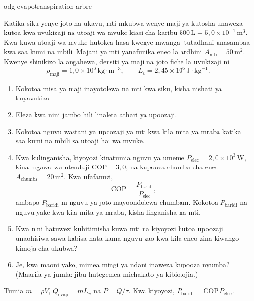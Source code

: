 \begin{exo}{odg-evapotranspiration-arbre}

Katika siku yenye joto na ukavu, mti mkubwa wenye maji ya kutosha unaweza kutoa kwa uvukizaji na utoaji wa mvuke kiasi cha karibu $500\,\text{L}=5{,}0\times10^{-1}\,\text{m}^3$. Kwa kuwa utoaji wa mvuke hutokea hasa kwenye mwanga, tutadhani unasambaa kwa saa kumi na mbili. Majani ya mti yanafunika eneo la ardhini $A_{\text{mti}}=50\,\text{m}^2$. Kwenye shinikizo la angahewa, densiti ya maji na joto fiche la uvukizaji ni
\[
\rho_{\text{maji}}=1{,}0\times10^3\,\text{kg}\!\cdot\!\text{m}^{-3},
\qquad L_v=2{,}45\times10^6\,\text{J}\!\cdot\!\text{kg}^{-1}.
\]

\begin{enumerate}
  \item Kokotoa misa ya maji inayotolewa na mti kwa siku, kisha nishati ya kuyavukiza.
  \item Eleza kwa nini jambo hili linaleta athari ya upoozaji.
  \item Kokotoa nguvu wastani ya upoozaji ya mti kwa kila mita ya mraba katika saa kumi na mbili za utoaji hai wa mvuke.
  \item Kwa kulinganisha, kiyoyozi kinatumia nguvu ya umeme $P_{\mathrm{elec}}=2{,}0\times10^3\,\text{W}$, kina mgawo wa utendaji $\mathrm{COP}=3{,}0$, na kupooza chumba cha eneo $A_{\text{chumba}}=20\,\text{m}^2$. Kwa ufafanuzi,
\[
\mathrm{COP}=\frac{P_{\text{baridi}}}{P_{\mathrm{elec}}},
\]
ambapo $P_{\text{baridi}}$ ni nguvu ya joto inayoondolewa chumbani. Kokotoa $P_{\text{baridi}}$ na nguvu yake kwa kila mita ya mraba, kisha linganisha na mti.
  \item Kwa nini hatuwezi kuhitimisha kuwa mti na kiyoyozi hutoa upoozaji unaohisiwa sawa kabisa hata kama nguvu zao kwa kila eneo zina kiwango kimoja cha ukubwa?
  \item Je, kwa maoni yako, mimea mingi ya ndani inaweza kupooza nyumba? (Maarifa ya jumla: jibu hutegemea michakato ya kibiolojia.)
\end{enumerate}

\begin{indication}
Tumia $m=\rho V$, $Q_{\mathrm{evap}}=mL_v$ na $P=Q/\tau$. Kwa kiyoyozi, $P_{\text{baridi}}=\mathrm{COP}\,P_{\mathrm{elec}}$.
\end{indication}


\end{exo}
